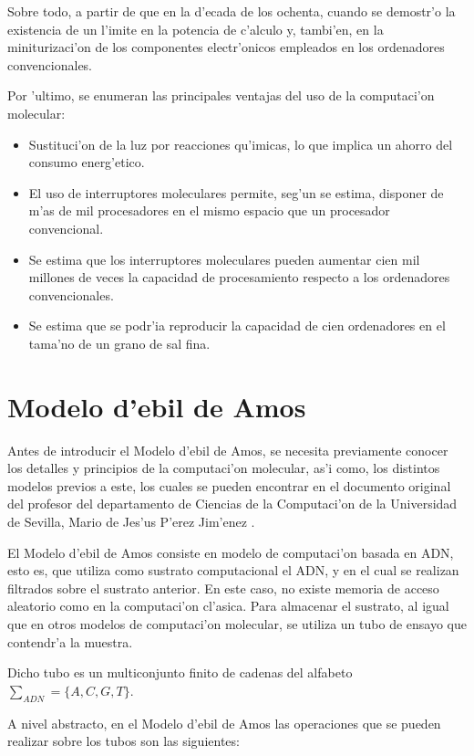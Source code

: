 \documentclass[12pt]{article}
\begin{document}
Sobre todo, a partir de que en la d'ecada de los ochenta, cuando se demostr'o la existencia de un l'imite en la potencia
de c'alculo y, tambi'en, en la miniturizaci'on de los componentes electr'onicos empleados en los ordenadores convencionales.

Por 'ultimo, se enumeran las principales ventajas del uso de la computaci'on molecular:

\begin{itemize}
	\item Sustituci'on de la luz por reacciones qu'imicas, lo que implica un ahorro del consumo energ'etico.
	\item El uso de interruptores moleculares permite, seg'un se estima, disponer de m'as de mil procesadores
    en el mismo espacio que un procesador convencional.
	\item Se estima que los interruptores moleculares pueden aumentar cien mil millones de veces la capacidad
    de procesamiento respecto a los ordenadores convencionales.
	\item Se estima que se podr'ia reproducir la capacidad de cien ordenadores en el tama'no de un grano de sal fina.
\end{itemize}

\section{Modelo d'ebil de Amos}

Antes de introducir el Modelo d'ebil de Amos, se necesita previamente conocer los detalles y principios
de la computaci'on molecular, as'i como, los distintos modelos previos a este, los cuales se pueden encontrar
en el documento original del profesor del departamento de Ciencias de la Computaci'on de la Universidad
de Sevilla, Mario de Jes'us P'erez Jim'enez \cite{Mario-deJesus}.

El Modelo d'ebil de Amos consiste en modelo de computaci'on basada en ADN, esto es, que utiliza como sustrato
computacional el ADN, y en el cual se realizan filtrados sobre el sustrato anterior. En este caso, no existe
memoria de acceso aleatorio como en la computaci'on cl'asica. Para almacenar el sustrato, al igual que en otros
modelos de computaci'on molecular, se utiliza un tubo de ensayo que contendr'a la muestra.

Dicho tubo es un multiconjunto finito de cadenas del alfabeto $\sum_{ADN} = \{A, C, G, T\}$.

A nivel abstracto, en el Modelo d'ebil de Amos las operaciones que se pueden realizar sobre los tubos
son las siguientes:
\end{document}

